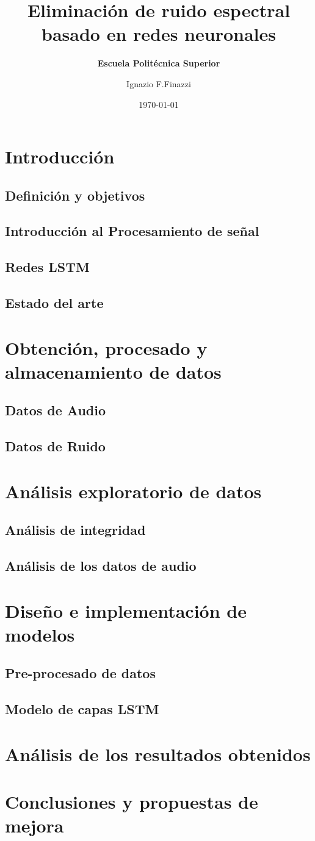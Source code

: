 \documentclass[10pt]{beamer}
\title[] %
{ %
      \textbf{Eliminación de ruido espectral basado en redes neuronales}
}
\subtitle[Escuela Politécnica Superior]
{
      \textbf{Escuela Politécnica Superior}
}
\author[Ignazio F.Finazzi]
{      Ignazio F.Finazzi \\
      {}
}
\institute[]
{
      Escuela Politécnica Superior\\
      Universidad Europea Miguel de Cervantes\\
  
}
\date{\today}
\begin{document}
	
	
	\scriptsize
	\section{Introducción}
		\subsection{Definición y objetivos}
			
		\subsection{Introducción al Procesamiento de señal}
			
		\subsection{Redes LSTM}
			
		\subsection{Estado del arte}
			
	\section{Obtención, procesado y almacenamiento de datos}
		\subsection{Datos de Audio}
			
		\subsection{Datos de Ruido}
			
	\section{Análisis exploratorio de datos}
		\subsection{Análisis de integridad}
			
		\subsection{Análisis de los datos de audio}
			
	\section{Diseño e implementación de modelos}
		\subsection{Pre-procesado de datos}
		\subsection{Modelo de capas LSTM}
	\section{Análisis de los resultados obtenidos}
	\section{Conclusiones y propuestas de mejora}
	
	
\end{document}
